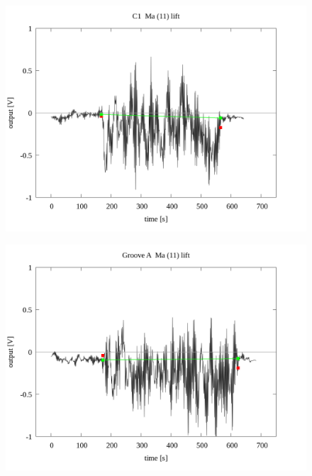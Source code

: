 \documentclass[a4paper]{jsarticle}
\begin{document}
\begin{figure}[htbp]
    \footnotesize
    \begin{center}
        \includegraphics[width=140mm]{../../../../33_result/210806/moving_average/11/lift/03/C1_ma(11)_lift_03.png}
    \end{center}
\end{figure}

\begin{figure}[htbp]
    \footnotesize
    \begin{center}
        \includegraphics[width=140mm]{../../../../33_result/210806/moving_average/11/lift/03/Groove_A_ma(11)_lift_03.png}
    \end{center}
\end{figure}
\end{document}
